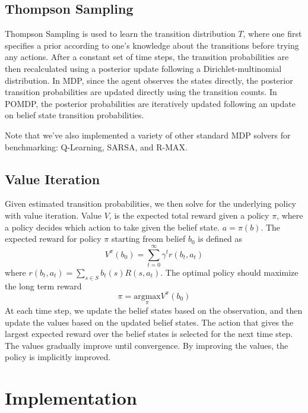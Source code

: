 \documentclass{pset}
\begin{document}
\subsection{Thompson Sampling}
Thompson Sampling is used to learn the transition distribution $T$, where one
first specifies a prior according to one's knowledge about the transitions
before trying any actions. After a constant set of time steps, the transition
probabilities are then recalculated using a posterior update following a
Dirichlet-multinomial distribution. In MDP, since the agent observes the states
directly, the posterior transition probabilities are updated directly using the
transition counts. In POMDP, the posterior probabilities are iteratively updated
following an update on belief state transition probabilities.

Note that we've also implemented a variety of other standard MDP solvers for
benchmarking: Q-Learning, SARSA, and R-MAX.

\subsection{Value Iteration}
Given estimated transition probabilities, we then solve for the underlying policy with value iteration. Value $V$, is the expected total reward
given a policy $\pi$, where a policy decides which action to take given the
belief state. $a = \pi(b)$. The expected reward for policy $\pi$ starting freom
belief $b_0$ is defined as
\[ V^{\pi}(b_{0})=\sum\limits_{t=0}^\infty \gamma^{t}r(b_t,a_t) \]
where $r(b_t, a_t) = \sum\limits_{s \in S} b_t(s)R(s,a_t)$.
The optimal policy should maximize the long term reward
\[ \pi = \underset{\pi}{\text{argmax}} V^{\pi}(b_0) \]
At each time step, we update the belief states based on the observation, and
then update the values based on the updated belief states. The action that gives
the largest expected reward over the belief states is selected for the next time
step. The values gradually improve until convergence.
By improving the values, the policy is implicitly improved.

\section{Implementation}
\end{document}
